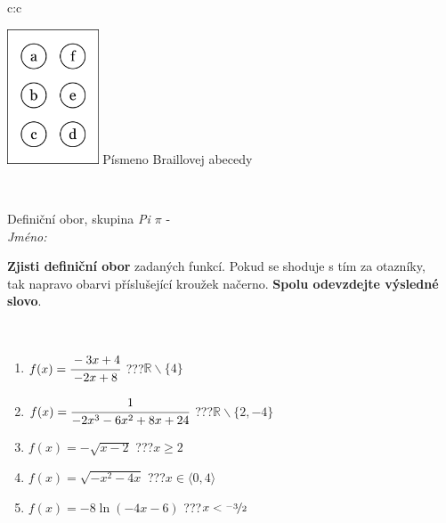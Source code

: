\documentclass[10pt]{report}
\begin{document}
\begin{tabular}{c:c}
\begin{minipage}[c][104.5mm][t]{0.5\linewidth}
\begin{center}
\begin{minipage}{0.20\linewidth}
\begin{center}
\includegraphics[height=40mm]{../images/braille.png}
{\small Písmeno Braillovej abecedy}
\end{center}
\end{minipage}
\end{center}
\end{minipage}
\\ \hdashline
\begin{minipage}[c][104.5mm][t]{0.5\linewidth}
\begin{center}
\vspace{7mm}
{\huge Definiční obor, skupina \textit{Pi $\pi$} -}\\[5mm]
\textit{Jméno:}\phantom{xxxxxxxxxxxxxxxxxxxxxxxxxxxxxxxxxxxxxxxxxxxxxxxxxxxxxxxxxxxxxxxxx}\\[5mm]
\begin{minipage}{0.95\linewidth}
\begin{center}
\textbf{Zjisti definiční obor} zadaných funkcí. Pokud se shoduje s tím za otazníky,\\tak napravo obarvi příslušející kroužek načerno. \textbf{Spolu odevzdejte výsledné slovo}.
\end{center}
\end{minipage}
\\[1mm]
\begin{minipage}{0.79\linewidth}
\begin{center}
\begin{varwidth}{\linewidth}
\begin{enumerate}
\normalsizerrr
\item $f(x)=\cfrac{-3x+4}{-2x+8}$\quad \dotfill\; ???\;\dotfill \quad $\mathbb{R}\smallsetminus\{4\}$
\item $f(x)=\cfrac{1}{-2x^3-6x^2+8x+24}$\quad \dotfill\; ???\;\dotfill \quad $\mathbb{R}\smallsetminus\{2,-4\}$
\item $f(x)=-\sqrt{x-2}$\quad \dotfill\; ???\;\dotfill \quad $x\geq2$
\item $f(x)=\sqrt{-x^2-4x}$\quad \dotfill\; ???\;\dotfill \quad $x\in\langle0 , 4\rangle$
\item $f(x)=-8\ln{(-4x-6)}$\quad \dotfill\; ???\;\dotfill \quad $x<\nicefrac{-3}{2}$

\end{enumerate}
\end{varwidth}
\end{center}
\end{minipage}
\end{center}
\end{minipage}
\end{tabular}
\end{document}
